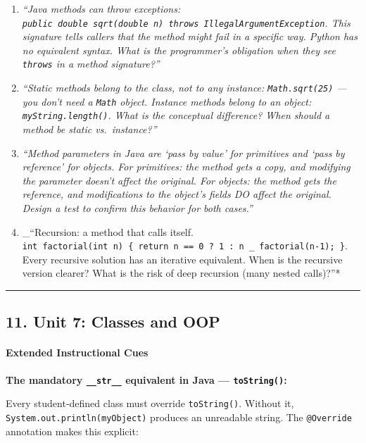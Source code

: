 \documentclass[
  justified,
  openright,
]{tufte-book}
\let\subsubsection\paragraph
\let\paragraph\paragraph
\let\subsubsection\paragraph
\let\paragraph\paragraph
\begin{document}
\begin{enumerate}
\def\labelenumi{\arabic{enumi}.}
\item
  \emph{``Java methods can throw exceptions:
  \texttt{public\ double\ sqrt(double\ n)\ throws\ IllegalArgumentException}.
  This signature tells callers that the method might fail in a specific
  way. Python has no equivalent syntax. What is the programmer's
  obligation when they see \texttt{throws} in a method signature?''}
\item
  \emph{``Static methods belong to the class, not to any instance:
  \texttt{Math.sqrt(25)} --- you don't need a \texttt{Math} object.
  Instance methods belong to an object: \texttt{myString.length()}. What
  is the conceptual difference? When should a method be static
  vs.~instance?''}
\item
  \emph{``Method parameters in Java are `pass by value' for primitives
  and `pass by reference' for objects. For primitives: the method gets a
  copy, and modifying the parameter doesn't affect the original. For
  objects: the method gets the reference, and modifications to the
  object's fields DO affect the original. Design a test to confirm this
  behavior for both cases.''}
\item
  \_``Recursion: a method that calls itself.
  \texttt{int\ factorial(int\ n)\ \{\ return\ n\ ==\ 0\ ?\ 1\ :\ n\ \_\ factorial(n-1);\ \}}.
  Every recursive solution has an iterative equivalent. When is the
  recursive version clearer? What is the risk of deep recursion (many
  nested calls)?''*
\end{enumerate}

\begin{center}\rule{0.5\linewidth}{0.5pt}\end{center}

\subsection{11. Unit 7: Classes and OOP}\label{unit-7-classes-and-oop}

\subsubsection{Extended Instructional
Cues}\label{extended-instructional-cues}

\textbf{The mandatory \texttt{\_\_str\_\_} equivalent in Java ---
\texttt{toString()}:}

Every student-defined class must override \texttt{toString()}. Without
it, \texttt{System.out.println(myObject)} produces an unreadable string.
The \texttt{@Override} annotation makes this explicit:
\end{document}
